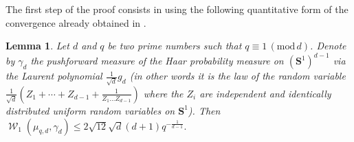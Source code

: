 \documentclass[12pt]{amsart}
\renewcommand{\mathcal}{\mathscr}
\newcommand{\Ss}{\mathbf{S}}
\newcommand{\mods}[1]{\,(\mathrm{mod}\,{#1})}
\DeclareMathOperator{\wass}{\mathcal{W}}
\theoremstyle{plain}
\newtheorem{lemma}[theorem]{Lemma}
\theoremstyle{remark}
\theoremstyle{definition}
\begin{document}
The first step of the proof consists in using the following
quantitative form of the convergence already obtained in
\cite[Th. 6.3]{gaussian_periods}.

\begin{lemma} \label{lem: quantitative duke garcia lutz} Let $d$ and
  $q$ be two prime numbers such that $q \equiv 1 \mods{d}$. Denote by
  $\gamma_d$ the pushforward measure of the Haar probability measure
  on $(\Ss^1)^{d-1}$ via the Laurent polynomial
  $\frac{1}{\sqrt{d}}g_d$ (in other words it is the law of the random
  variable
  $\frac{1}{\sqrt{d}}\left(Z_1 + \cdots + Z_{d-1} + \frac{1}{Z_1 \dots
      Z_{d-1}}\right)$ where the $Z_i$ are independent and identically
  distributed uniform random variables on $\Ss^1$).  Then
  $ \wass_1(\mu_{q,d}, \gamma_d) \leqslant 2 \sqrt{12} \sqrt{d} (d+1)
  q^{-\frac{1}{d-1}} .  $
\end{lemma}
\end{document}
